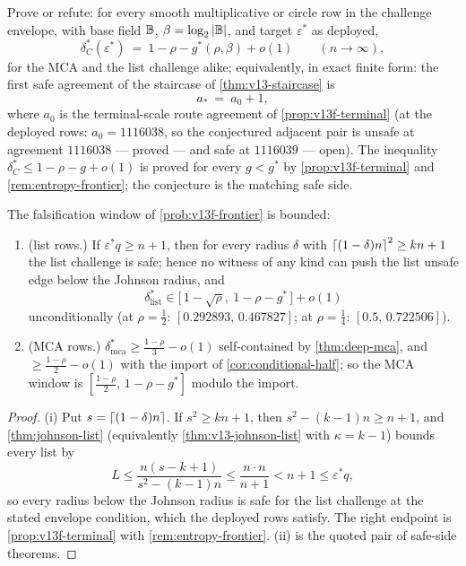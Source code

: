 \begin{problem}\label{prob:v13f-frontier}
Prove or refute: for every smooth multiplicative or circle row in the challenge envelope, with base field $\mathbb B$, $\beta=\log_2|\mathbb B|$, and target $\varepsilon^*$ as deployed,
\[
        \delta^*_C(\varepsilon^*)\ =\ 1-\rho-g^*(\rho,\beta)+o(1)
        \qquad(n\to\infty),
\]
for the MCA and the list challenge alike; equivalently, in exact finite form: the first safe agreement of the staircase of \cref{thm:v13-staircase} is
\[
        a_*\ =\ a_0+1,
\]
where $a_0$ is the terminal-scale route agreement of \cref{prop:v13f-terminal} \textup(at the deployed rows: $a_0=1116038$, so the conjectured adjacent pair is unsafe at agreement $1116038$ --- proved --- and safe at $1116039$ --- open\textup).  The inequality $\delta^*_C\le1-\rho-g+o(1)$ is proved for every $g<g^*$ by \cref{prop:v13f-terminal} and \cref{rem:entropy-frontier}; the conjecture is the matching safe side.
\end{problem}

\begin{fact}\label{fact:v13f-floors}
The falsification window of \cref{prob:v13f-frontier} is bounded:
\begin{enumerate}[label=\textup{(\roman*)}]
\item \textup{(list rows.)}  If $\varepsilon^*q\ge n+1$, then for every radius $\delta$ with $\left\lceil (1-\delta)n\right\rceil^2\ge kn+1$ the list challenge is safe; hence no witness of any kind can push the list unsafe edge below the Johnson radius, and
\[
        \delta^*_{\mathrm{list}}\in\bigl[\,1-\sqrt\rho,\ 1-\rho-g^*\,\bigr]+o(1)
\]
unconditionally \textup(at $\rho=\tfrac12$: $[0.292893,\,0.467827]$; at $\rho=\tfrac14$: $[0.5,\,0.722506]$\textup).
\item \textup{(MCA rows.)}  $\delta^*_{\mathrm{mca}}\ge\tfrac{1-\rho}3-o(1)$ self-contained by \cref{thm:deep-mca}, and $\ge\tfrac{1-\rho}2-o(1)$ with the import of \cref{cor:conditional-half}; so the MCA window is $[\tfrac{1-\rho}2,\,1-\rho-g^*]$ modulo the import.
\end{enumerate}
\end{fact}

\begin{proof}
\textup{(i)}  Put $s=\left\lceil (1-\delta)n\right\rceil$.  If $s^2\ge kn+1$, then $s^2-(k-1)n\ge n+1$, and \cref{thm:johnson-list} \textup(equivalently \cref{thm:v13-johnson-list} with $\kappa=k-1$\textup) bounds every list by
\[
        L\le\frac{n(s-k+1)}{s^2-(k-1)n}\le\frac{n\cdot n}{n+1}<n+1\le\varepsilon^*q ,
\]
so every radius below the Johnson radius is safe for the list challenge at the stated envelope condition, which the deployed rows satisfy.  The right endpoint is \cref{prop:v13f-terminal} with \cref{rem:entropy-frontier}.  \textup{(ii)} is the quoted pair of safe-side theorems.
\end{proof}

